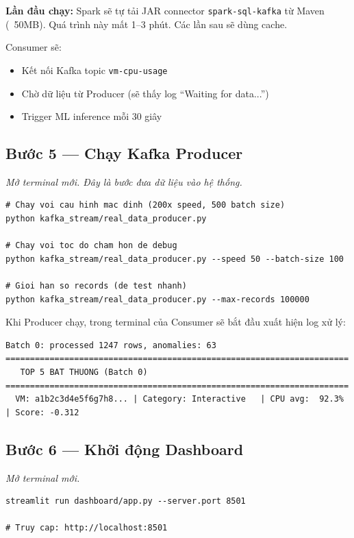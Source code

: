 \documentclass[12pt,a4paper]{article}
\begin{document}
\begin{notebox}
\textbf{Lần đầu chạy:} Spark sẽ tự tải JAR connector \texttt{spark-sql-kafka} từ Maven (~50MB). Quá trình này mất 1--3 phút. Các lần sau sẽ dùng cache.
\end{notebox}

Consumer sẽ:
\begin{itemize}
  \item Kết nối Kafka topic \texttt{vm-cpu-usage}
  \item Chờ dữ liệu từ Producer (sẽ thấy log ``Waiting for data...'')
  \item Trigger ML inference mỗi 30 giây
\end{itemize}

\subsection{Bước 5 — Chạy Kafka Producer}

\textit{Mở terminal mới. Đây là bước đưa dữ liệu vào hệ thống.}

\begin{lstlisting}[style=bash, caption={Chạy Producer với các tốc độ khác nhau}]
# Chay voi cau hinh mac dinh (200x speed, 500 batch size)
python kafka_stream/real_data_producer.py

# Chay voi toc do cham hon de debug
python kafka_stream/real_data_producer.py --speed 50 --batch-size 100

# Gioi han so records (de test nhanh)
python kafka_stream/real_data_producer.py --max-records 100000
\end{lstlisting}

Khi Producer chạy, trong terminal của Consumer sẽ bắt đầu xuất hiện log xử lý:
\begin{lstlisting}[style=bash]
Batch 0: processed 1247 rows, anomalies: 63
======================================================================
   TOP 5 BAT THUONG (Batch 0)
======================================================================
  VM: a1b2c3d4e5f6g7h8... | Category: Interactive   | CPU avg:  92.3% | Score: -0.312
\end{lstlisting}

\subsection{Bước 6 — Khởi động Dashboard}

\textit{Mở terminal mới.}

\begin{lstlisting}[style=bash, caption={Chạy Streamlit dashboard}]
streamlit run dashboard/app.py --server.port 8501

# Truy cap: http://localhost:8501
\end{lstlisting}
\end{document}
